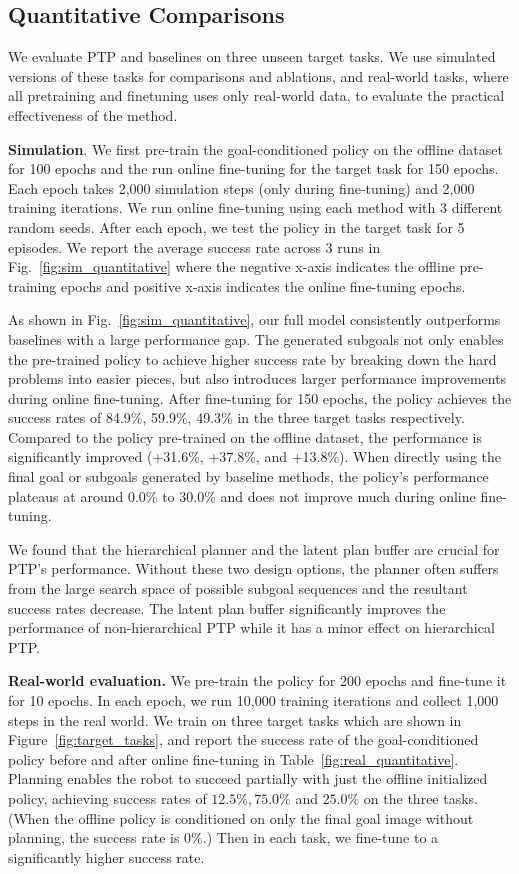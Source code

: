 \subsection{Quantitative Comparisons}

We evaluate PTP and baselines on three unseen target tasks. We use simulated versions of these tasks for comparisons and ablations, and real-world tasks, where all pretraining and finetuning uses only real-world data, to evaluate the practical effectiveness of the method.

\textbf{Simulation}. We first pre-train the goal-conditioned policy on the offline dataset for 100 epochs and the run online fine-tuning for the target task for 150 epochs. Each epoch takes 2,000 simulation steps (only during fine-tuning) and 2,000 training iterations. We run online fine-tuning using each method with 3 different random seeds. After each epoch, we test the policy in the target task for 5 episodes. We report the average success rate across 3 runs in Fig.~\ref{fig:sim_quantitative} where the negative x-axis indicates the offline pre-training epochs and positive x-axis indicates the online fine-tuning epochs.

As shown in Fig.~\ref{fig:sim_quantitative}, our full model consistently outperforms baselines with a large performance gap. The generated subgoals not only enables the pre-trained policy to achieve higher success rate by breaking down the hard problems into easier pieces, but also introduces larger performance improvements during online fine-tuning. After fine-tuning for 150 epochs, the policy achieves the success rates of 84.9\%, 59.9\%, 49.3\% in the three target tasks respectively. Compared to the policy pre-trained on the offline dataset, the performance is significantly improved (+31.6\%, +37.8\%, and +13.8\%). When directly using the final goal or subgoals generated by baseline methods, the policy's performance plateaus at around 0.0\% to 30.0\% and does not improve much during online fine-tuning. 

We found that the hierarchical planner and the latent plan buffer are crucial for PTP's performance. Without these two design options, the planner often suffers from the large search space of possible subgoal sequences and the resultant success rates decrease. The latent plan buffer significantly improves the performance of non-hierarchical PTP while it has a minor effect on hierarchical PTP.   

\textbf{Real-world evaluation.} We pre-train the policy for 200 epochs and fine-tune it for 10 epochs. In each epoch, we run 10,000 training iterations and collect 1,000 steps in the real world. We train on three target tasks which are shown in Figure~\ref{fig:target_tasks}, and report the success rate of the goal-conditioned policy before and after online fine-tuning in Table~\ref{fig:real_quantitative}. Planning enables the robot to succeed partially with just the offline initialized policy, achieving success rates of $12.5\%, 75.0\%$ and $25.0\%$ on the three tasks. (When the offline policy is conditioned on only the final goal image without planning, the success rate is $0\%$.) Then in each task, we fine-tune to a significantly higher success rate.


